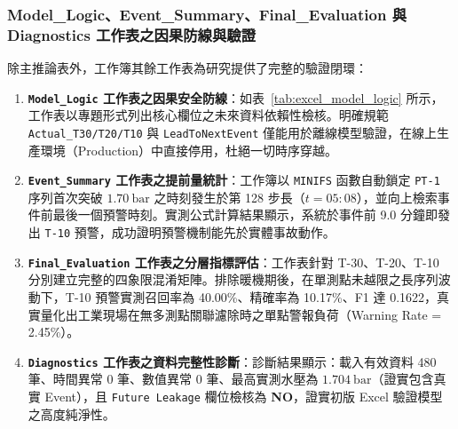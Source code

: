 \documentclass[fontset=none, a4paper, 12pt]{ctexart}
\begin{document}
\begin{doublespace}
\subsubsection{Model\_Logic、Event\_Summary、Final\_Evaluation 與 Diagnostics 工作表之因果防線與驗證}
\label{sec:excel_other_sheets}
除主推論表外，工作簿其餘工作表為研究提供了完整的驗證閉環：
\begin{enumerate}
    \item \textbf{\texttt{Model\_Logic} 工作表之因果安全防線}：如表~\ref{tab:excel_model_logic} 所示，工作表以專題形式列出核心欄位之未來資料依賴性檢核。明確規範 \texttt{Actual\_T30/T20/T10} 與 \texttt{LeadToNextEvent} 僅能用於離線模型驗證，在線上生產環境（Production）中直接停用，杜絕一切時序穿越。
    \item \textbf{\texttt{Event\_Summary} 工作表之提前量統計}：工作簿以 \texttt{MINIFS} 函數自動鎖定 \texttt{PT-1} 序列首次突破 $1.70\ \mathrm{bar}$ 之時刻發生於第 128 步長（$t=05:08$），並向上檢索事件前最後一個預警時刻。實測公式計算結果顯示，系統於事件前 9.0 分鐘即發出 \texttt{T-10} 預警，成功證明預警機制能先於實體事故動作。
    \item \textbf{\texttt{Final\_Evaluation} 工作表之分層指標評估}：工作表針對 T-30、T-20、T-10 分別建立完整的四象限混淆矩陣。排除暖機期後，在單測點未越限之長序列波動下，T-10 預警實測召回率為 40.00\%、精確率為 10.17\%、F1 達 0.1622，真實量化出工業現場在無多測點關聯濾除時之單點警報負荷（Warning Rate = 2.45\%）。
    \item \textbf{\texttt{Diagnostics} 工作表之資料完整性診斷}：診斷結果顯示：載入有效資料 480 筆、時間異常 0 筆、數值異常 0 筆、最高實測水壓為 $1.704\ \mathrm{bar}$（證實包含真實 Event），且 \texttt{Future Leakage} 欄位檢核為 \textbf{NO}，證實初版 Excel 驗證模型之高度純淨性。
\end{enumerate}


\end{doublespace}
\end{document}
